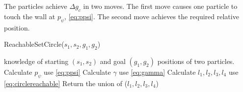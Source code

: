 The particles achieve $\Delta g_c$ in two moves. The first move causes one particle to touch the wall at $p_\psi$, \eqref{eq:ppsi}. The second move achieves the required relative position.
 
\begin{algorithm}[htb]
\caption{ { \sc ReachableSetCircle}($s_1,s_2,g_1,g_2$)}\label{alg:circularReachbale}
\begin{algorithmic}[1]
\Require knowledge of starting $(s_1,s_2)$ and goal $(g_1,g_2)$ positions of  two particles. 
\State Calculate $p_{\psi}$ \Comment use \eqref{eq:ppsi}
\State Calculate $\gamma$ \Comment use \eqref{eq:gamma}
\State Calculate $l_1, l_2, l_3, l_4$ \Comment use \eqref{eq:circlereachable} 
\State Return the union of ($l_1, l_2, l_3, l_4$)
\end{algorithmic}
\end{algorithm}
 
% 
 

   


